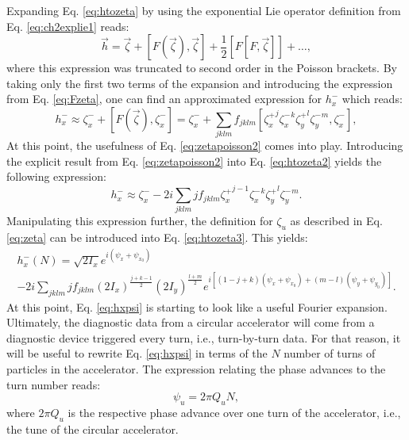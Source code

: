 Expanding Eq. \ref{eq:htozeta} by using the exponential Lie operator definition from Eq. \ref{eq:ch2explie1} reads:
\begin{equation}
    \label{eq:htozetaexpansion}
    \vec{h}=\vec{\zeta}+\left[ F \left(\vec{\zeta}\right), \vec{\zeta}\right]+\frac{1}{2} \left[ F \left[ F , \vec{\zeta}\right] \right] + \dots,
\end{equation}
where this expression was truncated to second order in the Poisson brackets. By taking only the first two terms of the expansion and introducing the expression from Eq. \ref{eq:Fzeta}, one can find an approximated expression for $h_{x}^{-}$ which reads:
\begin{equation}
    \label{eq:htozeta2}
    h_x^- \approx \zeta_x^{-} + \left[ F \left(\vec{\zeta}\right), \zeta_x^{-}\right] =  \zeta_x^{-} + \sum_{jklm} f_{jklm} \left[ {\zeta_x^{+}}^{j} {\zeta_x^{-}}^k {\zeta_y^{+}}^l {\zeta_y^{-}}^m, \zeta_x^{-}\right],
\end{equation}
At this point, the usefulness of Eq. \ref{eq:zetapoisson2} comes into play. Introducing the explicit result from Eq. \ref{eq:zetapoisson2} into Eq. \ref{eq:htozeta2} yields the following expression:
\begin{equation}
    \label{eq:htozeta3}
    h_x^- \approx \zeta_x^{-} -2i \sum_{jklm}j f_{jklm} {\zeta_x^{+}}^{j-1} {\zeta_x^{-}}^k {\zeta_y^{+}}^l {\zeta_y^{-}}^m.
\end{equation}
Manipulating this expression further, the definition for $\zeta_u$ as described in Eq. \ref{eq:zeta} can be introduced into Eq. \ref{eq:htozeta3}. This yields:
\begin{multline}
    \label{eq:hxpsi}
    h_x^{-}(N)=\sqrt{2I_x}e^{i\left( \psi_x+\psi_{x_0}\right)} \\
    -2i \sum_{jklm} j f_{jklm} \left( 2I_x \right)^{\frac{j+k-1}{2}}\left( 2I_y \right)^{\frac{l+m}{2}}
    e^{i \left[ \left( 1-j+k\right)\left( \psi_x + \psi_{x_0} \right) +\left( m-l\right)\left( \psi_y + \psi_{y_0} \right)\right]}.
\end{multline}
At this point, Eq. \ref{eq:hxpsi} is starting to look like a useful Fourier expansion. Ultimately, the diagnostic data from a circular accelerator will come from a diagnostic device triggered every turn, i.e., turn-by-turn data. For that reason, it will be useful to rewrite Eq. \ref{eq:hxpsi} in terms of the $N$ number of turns of particles in the accelerator. The expression relating the phase advances to the turn number reads:
\begin{equation}
    \label{eq:psiu}
    \psi_u=2 \pi Q_u N, 
\end{equation}  
where $2 \pi Q_u$ is the respective phase advance over one turn of the accelerator, i.e., the tune of the circular accelerator.


